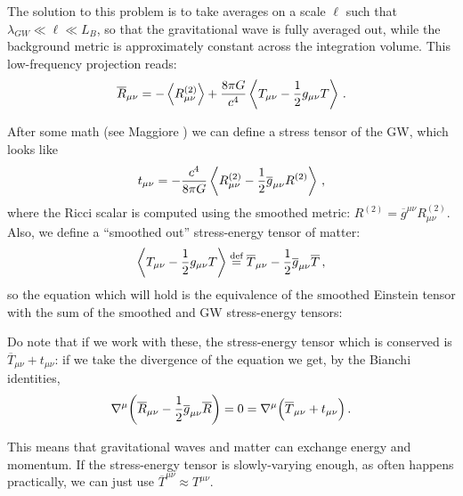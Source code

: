 \documentclass[main.tex]{subfiles}
\begin{document}
The solution to this problem is to take averages on a scale \(\ell\) such that \(\lambda_{GW} \ll \ell \ll L_B\), so that the gravitational wave is fully averaged out, while the background metric is approximately constant across the integration volume.
This low-frequency projection reads:
%
\begin{align}
\overline{R}_{\mu \nu } =
- \expval{R^{(2)}_{\mu \nu }} + \frac{8 \pi G}{c^{4}} \expval{T_{\mu \nu } - \frac{1}{2} g_{\mu \nu } T} 
\,.
\end{align}

After some math (see Maggiore \cite[eqs.\ 1.122-1.123]{maggioreGravitationalWavesVolume2007}) we can define a stress tensor of the GW, which looks like 
%
\begin{align}
t_{\mu \nu } = - \frac{c^{4}}{8 \pi G} \expval{R^{(2)}_{\mu \nu } - \frac{1}{2} \overline{g}_{\mu \nu } R^{(2)}}
\,,
\end{align}
%
where the Ricci scalar is computed using the smoothed metric: \(R^{(2)} = \overline{g}^{\mu \nu } R_{\mu \nu }^{(2)}\). 
Also, we define a  ``smoothed out'' stress-energy tensor of matter: 
%
\begin{align}
\expval{T_{\mu \nu } - \frac{1}{2} g_{\mu \nu } T}
\overset{\text{def}}{=}
\overline{T}_{\mu \nu } - \frac{1}{2} \overline{g}_{\mu \nu } \overline{T}
\,,
\end{align}
%
so the equation which will hold is the equivalence of the smoothed Einstein tensor with the sum of the smoothed and GW stress-energy tensors:
%

Do note that if we work with these, the stress-energy tensor which is conserved is \(\overline{T}_{\mu \nu } + t_{\mu \nu }\): if we take the divergence of the equation we get, by the Bianchi identities,
%
\begin{align}
\nabla^{\mu } \qty(\overline{R}_{\mu \nu } - \frac{1}{2} \overline{g}_{\mu \nu }\overline{R}) = 0 = \nabla^{\mu } \qty(\overline{T}_{\mu \nu } + t_{\mu \nu })
\,.
\end{align}

This means that gravitational waves and matter can exchange energy and momentum. If the stress-energy tensor is slowly-varying enough, as often happens practically, we can just use \(\overline{T}^{\mu \nu } \approx T^{\mu \nu }\).
\end{document}
